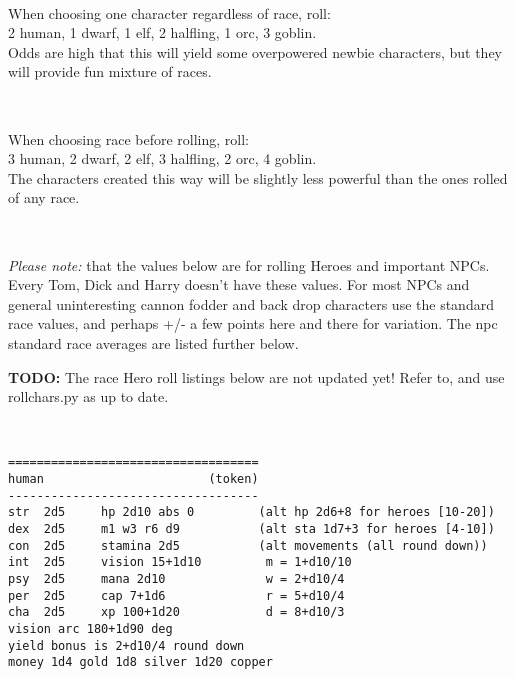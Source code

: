 \

When choosing one character regardless of race, roll:\\
2 human, 1 dwarf, 1 elf, 2 halfling, 1 orc, 3 goblin.\\
Odds are high that this will yield some overpowered newbie characters, but they will provide fun mixture of races.

\

When choosing race before rolling, roll:\\
3 human, 2 dwarf, 2 elf, 3 halfling, 2 orc, 4 goblin.\\
The characters created this way will be slightly less powerful than the ones rolled of any race.

\

\emph{Please note:} that the values below are for rolling Heroes and important NPCs. Every Tom, Dick and Harry doesn't have these values. For most NPCs and general uninteresting cannon fodder and back drop characters use the standard race values, and perhaps +/- a few points here and there for variation. The npc standard race averages are listed further below.



\textbf{TODO:} The race Hero roll listings below are not updated yet! Refer to, and use rollchars.py as up to date.

\

\small \begin{samepage} \begin{verbatim}
===================================
human                       (token)
-----------------------------------
str  2d5     hp 2d10 abs 0         (alt hp 2d6+8 for heroes [10-20])
dex  2d5     m1 w3 r6 d9           (alt sta 1d7+3 for heroes [4-10])
con  2d5     stamina 2d5           (alt movements (all round down))
int  2d5     vision 15+1d10         m = 1+d10/10
psy  2d5     mana 2d10              w = 2+d10/4
per  2d5     cap 7+1d6              r = 5+d10/4
cha  2d5     xp 100+1d20            d = 8+d10/3
vision arc 180+1d90 deg
yield bonus is 2+d10/4 round down
money 1d4 gold 1d8 silver 1d20 copper
\end{verbatim} \end{samepage}

